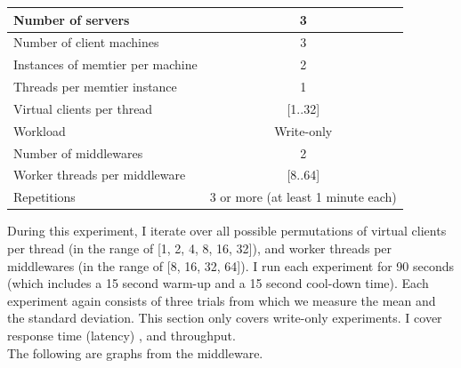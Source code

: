\documentclass[11pt,a4paper]{article}
\begin{document}
\begin{center}
	\scriptsize{
		\begin{tabular}{|l|c|}
			\hline Number of servers                & 3          \\ 
			\hline Number of client machines        & 3          \\ 
			\hline Instances of memtier per machine & 2          \\ 
			\hline Threads per memtier instance     & 1          \\
			\hline Virtual clients per thread       & [1..32]    \\ 
			\hline Workload                         & Write-only \\
			\hline Number of middlewares            & 2          \\
			\hline Worker threads per middleware    & [8..64]    \\
			\hline Repetitions                      & 3 or more (at least 1 minute each)  \\ 
			\hline 
		\end{tabular}
	} 
\end{center}

During this experiment, I iterate over all possible permutations of virtual clients per thread (in the range of [1, 2, 4, 8, 16, 32]), and worker threads per middlewares (in the range of [8, 16, 32, 64]).
I run each experiment for 90 seconds (which includes a 15 second warm-up and a 15 second cool-down time). 
Each experiment again consists of three trials from which we measure the mean and the standard deviation.
This section only covers write-only experiments.
I cover response time (latency) , and throughput. \\

The following are graphs from the middleware.
\end{document}
